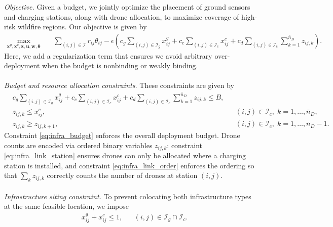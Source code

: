 \documentclass[pdflatex,sn-mathphys-num]{sn-jnl}%
\theoremstyle{thmstyleone}%
\theoremstyle{thmstyletwo}%
\theoremstyle{thmstylethree}%
\begin{document}
\vspace{0.3cm}
\noindent \textit{Objective.} Given a budget, we jointly optimize the placement of ground sensors and charging stations, along with drone allocation, to maximize coverage of high-risk wildfire regions. Our objective is given by
\begin{align}
    \max_{\bm x^g,\bm x^c,\bm z,\bm u,\bm w,\bm \theta}\quad
& \sum_{(i,j)\in\mathcal I} r_{ij}\theta_{ij}
-\epsilon\left(
c_g\sum_{(i,j)\in\mathcal I_g} x^g_{ij}
+c_c\sum_{(i,j)\in\mathcal I_{\mathrm{c}}}x^c_{ij}
+c_d\sum_{(i,j)\in\mathcal I_{\mathrm{c}}}\sum_{k=1}^{\bar n_D}z_{ij,k}
\right).
\label{eq:infra_obj}
\end{align}
\noindent Here, we add a regularization term that ensures we avoid arbitrary over-deployment when the budget is nonbinding or weakly binding.\\
\\
\noindent \textit{Budget and resource allocation constraints.} These constraints are given by
\begin{align}
& c_g\sum_{(i,j)\in\mathcal I_g} x^g_{ij}
+c_c\sum_{(i,j)\in\mathcal I_c}x^c_{ij}
+c_d\sum_{(i,j)\in\mathcal I_c}\sum_{k=1}^{\bar n_D}z_{ij,k}
\le B,
\label{eq:infra_budget}\\
& z_{ij,k}\le x^c_{ij},
&&  (i,j)\in\mathcal I_c,\; k=1,\dots,\bar n_D,
\label{eq:infra_link_station}\\
& z_{ij,k}\ge z_{ij,k+1},
&&  (i,j)\in\mathcal I_c,\; k=1,\dots,\bar n_D-1.
\label{eq:infra_link_order}
\end{align}
Constraint \eqref{eq:infra_budget} enforces the overall deployment budget. Drone counts are encoded via ordered binary variables $z_{ij,k}$: constraint \eqref{eq:infra_link_station} ensures drones can only be allocated where a charging station is installed, and constraint \eqref{eq:infra_link_order} enforces the ordering so that $\sum_k z_{ij,k}$ correctly counts the number of drones at station $(i,j)$.\\
\\
\noindent \textit{Infrastructure siting constraint.} To prevent colocating both infrastructure types at the same feasible location, we impose
\begin{align}
& x^g_{ij}+x^c_{ij}\le 1,
&&  (i,j)\in\mathcal I_g \cap \mathcal I_c.
\label{eq:infra_exclusion}
\end{align}
\end{document}

